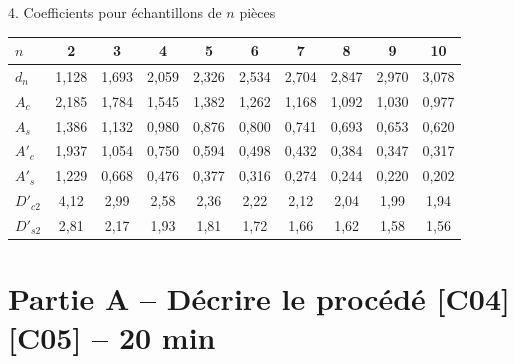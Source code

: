 \documentclass[a4paper,11pt]{article}
\newcommand{\duree}[1]{\hfill{\normalsize\color{uimmred}#1}}
\begin{document}
\begin{rappel}{4. Coefficients pour échantillons de $n$ pièces}
\small
\begin{center}\small
\renewcommand{\arraystretch}{1.2}
\begin{tabular}{|l|*{9}{c|}}\hline
\rowcolor{white}
$n$ & 2 & 3 & 4 & 5 & 6 & 7 & 8 & 9 & 10 \\ \hline
$d_n$ & 1,128 & 1,693 & 2,059 & 2,326 & 2,534 & 2,704 & 2,847 & 2,970 & 3,078 \\ \hline
$A_c$ & 2,185 & 1,784 & 1,545 & 1,382 & 1,262 & 1,168 & 1,092 & 1,030 & 0,977 \\ \hline
$A_s$ & 1,386 & 1,132 & 0,980 & 0,876 & 0,800 & 0,741 & 0,693 & 0,653 & 0,620 \\ \hline
$A'_c$ & 1,937 & 1,054 & 0,750 & 0,594 & 0,498 & 0,432 & 0,384 & 0,347 & 0,317 \\ \hline
$A'_s$ & 1,229 & 0,668 & 0,476 & 0,377 & 0,316 & 0,274 & 0,244 & 0,220 & 0,202 \\ \hline
$D'_{c2}$ & 4,12 & 2,99 & 2,58 & 2,36 & 2,22 & 2,12 & 2,04 & 1,99 & 1,94 \\ \hline
$D'_{s2}$ & 2,81 & 2,17 & 1,93 & 1,81 & 1,72 & 1,66 & 1,62 & 1,58 & 1,56 \\ \hline
\end{tabular}
\end{center}
\end{rappel}

\newpage
\section{Partie A -- Décrire le procédé \duree{[C04] [C05] -- 20 min}}
\end{document}
